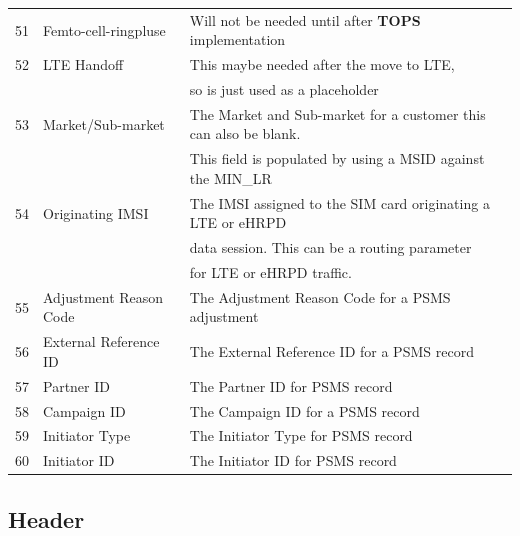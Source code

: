\documentclass[12pt,twoside]{article}
\begin{document}
\begin{longtable}{cll}
             51  &  Femto-cell-ringpluse     &  Will not be needed until after \textbf{TOPS} implementation            \\
             52  &  LTE Handoff              &  This maybe needed after the move to LTE,                               \\
                 &                           &  so is just used as a placeholder                                       \\
             53  &  Market/Sub-market        &  The Market and Sub-market for a customer this can also be blank.       \\
                 &                           &  This field is populated by using a MSID against the MIN\_LR            \\
             54  &  Originating IMSI         &  The IMSI assigned to the SIM card originating a LTE or eHRPD           \\
                 &                           &  data session. This can be a routing parameter                          \\
                 &                           &  for LTE or eHRPD traffic.                                              \\
             55  &  Adjustment Reason Code   &  The Adjustment Reason Code for a PSMS adjustment                       \\
             56  &  External Reference ID    &  The External Reference ID for a PSMS record                            \\
             57  &  Partner ID               &  The Partner ID for PSMS record                                         \\
             58  &  Campaign ID              &  The Campaign ID for a PSMS record                                      \\
             59  &  Initiator Type           &  The Initiator Type for PSMS record                                     \\
             60  &  Initiator ID             &  The Initiator ID for PSMS record                                       \\
\hline
\end{longtable}

\normalsize
\subsection{Header}
\label{sec-7-2}
\end{document}
